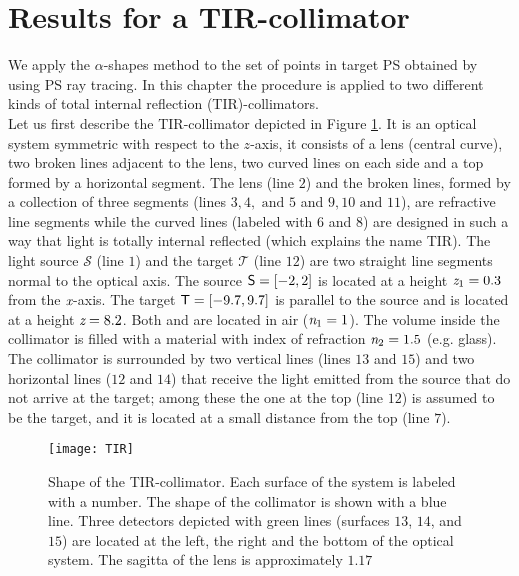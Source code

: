 \section{Results for a TIR-collimator}\label{sec:results-Tir-alpha}
We apply the $\alpha$-shapes method to the set of points in target PS obtained by using PS ray tracing.
In this chapter the procedure is applied to two different kinds of total internal reflection (TIR)-collimators.\\ \indent  
Let us first describe the TIR-collimator depicted in Figure \ref{fig:tir}. It is an optical system symmetric with respect to the $z$-axis, it consists of a lens (central curve), two broken lines adjacent to the lens,
two curved lines on each side and a top formed by a horizontal segment. The lens (line $2$) and the broken lines, formed by a collection of three segments (lines $3, 4, \mbox{ and } 5$ and $9, 10 \mbox{ and } 11$), are refractive line segments while the curved lines (labeled with $6$ and $8$) are designed in such a way that light is totally internal reflected (which explains the name TIR).
The light source $\mathcal{S}$ (line $1$) and the target $\mathcal{T}$ (line $12$) are two straight line segments normal to the optical axis.
The source $\textsf{S}= [-2,2]$ is located at a height $\textit{z}_{1} = 0.3$ from the $\textit{x}$-axis.
 The target $\textsf{T}= [-9.7, 9.7]$ is parallel to the source and is located at a height $ \textit{z}= 8.2$. Both  and  are located in air ($\textit{n}_1=1$).
The volume inside the collimator is filled with a material with index of refraction $\textit{n}_2=1.5$ (e.g. glass).
The collimator is surrounded by two vertical lines (lines $13$ and $15$) and two horizontal lines ($12$ and $14$) that receive the light emitted from the source that do not arrive at the target; among these the one at the top (line $12$) is assumed to be the target, and it is located at a small distance from the top (line $7$). 
\begin{figure}[h]
  \begin{center}
  \texttt{[image: TIR]}
  \end{center}
  \caption{Shape of the TIR-collimator. Each surface of the system is labeled with a number.
   The shape of the collimator is shown with a blue line.
   Three detectors depicted with green lines (surfaces $13$, $14$, and $15$) are located at the left, the right and the bottom of the optical system.
The sagitta of the lens is approximately $1.17$}
  \label{fig:tir}
\end{figure}
